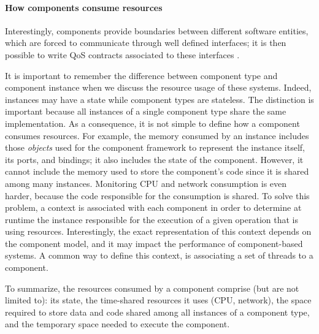 \paragraph{How components consume resources}
Interestingly, components provide boundaries between different software entities, which are forced to communicate through well defined interfaces; it is then possible to write \gls{QoS} contracts associated to these interfaces \cite{Beugnard774917}.

It is important to remember the difference between component type and component instance when we discuss the resource usage of these systems.
Indeed, instances may have a state while component types are stateless.
The distinction is important because all instances of a single component type share the same implementation.
As a consequence, it is not simple to define how a component consumes resources.
For example, the memory consumed by an instance includes those \textit{objects} used for the component framework to represent the instance itself, its ports, and bindings; it also includes the state of the component. 
However, it cannot include the memory used to store the component's code since it is shared among many instances.
Monitoring CPU and network consumption is even harder, because the code responsible for the consumption is shared.
To solve this problem, a context is associated with each component in order to determine at runtime the instance responsible for the execution of a given operation that is using resources.
Interestingly, the exact representation of this context depends on the component model, and it may impact the performance of component-based systems.
A common way to define this context, is associating a set of threads to a component.

To summarize, the resources consumed by a component comprise (but are not limited to): its state, the time-shared resources it uses (CPU, network), the space required to store data and code shared among all instances of a component type, and the temporary space needed to execute the component.       

